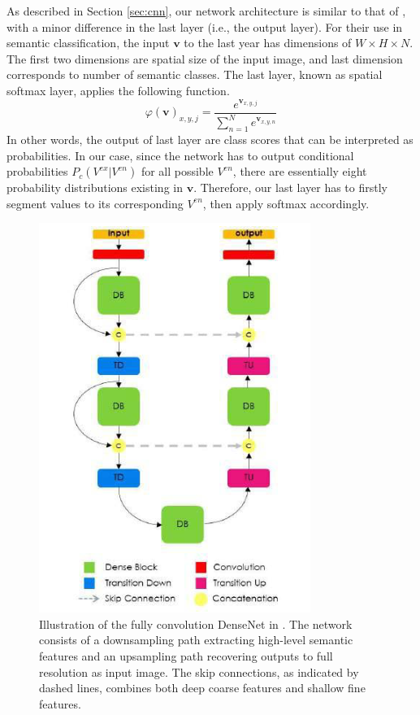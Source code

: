 As described in Section \ref{sec:cnn}, our network architecture is similar to that of \citet{jegou2017one}, with a minor difference in the last layer (i.e., the output layer). For their use in semantic classification, the input $\mathbf{v}$ to the last year has dimensions of $W\times H \times N$. The first two dimensions are spatial size of the input image, and last dimension corresponds to number of semantic classes. The last layer, known as spatial softmax layer, applies the following function.
\[\varphi(\mathbf{v})_{x, y, j} = \frac{e^{\mathbf{v}_{x, y, j}}}{\sum_{n=1}^N e^{\mathbf{v}_{x, y, n}}}\]
In other words, the output of last layer are class scores that can be interpreted as probabilities. In our case, since the network has to output conditional probabilities $P_c({V^{ex}|V^{en}})$ for all possible $V^{en}$, there are essentially eight probability distributions existing in $\mathbf{v}$. Therefore, our last layer has to firstly segment values to its corresponding $V^{en}$, then apply softmax accordingly. 

\begin{figure}[H]
  \centering
    \includegraphics[width=.45\textwidth]{figures/tiramisu.png}
    \caption[Illustration of the fully convolution DenseNet.]{Illustration of the fully convolution DenseNet in \citep{jegou2017one}. The network consists of a downsampling path extracting high-level semantic features and an upsampling path recovering outputs to full resolution as input image. The skip connections, as indicated by dashed lines, combines both deep coarse features and shallow fine features.}
    \label{fig:tiramisu}
\end{figure}

